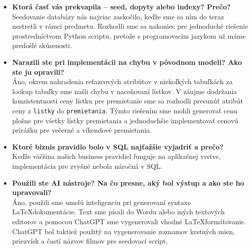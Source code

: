 \documentclass[11pt, a4paper]{article}
\begin{document}
\begin{itemize}
    \item \textbf{Ktorá časť vás prekvapila -- seed, dopyty alebo indexy?
    Prečo?} \\
    Seedovanie databázy nás najviac zaskočilo, keďže sme sa ním do teraz nestretli v rámci predmetu. Rozhodli sme sa nakoniec pre jednoduché riešenie prostredníctvom Python scriptu, pretože s programovacím jazykom už máme predošlé skúsenosti. 

    \item \textbf{Narazili ste pri implementácii na chybu v pôvodnom modeli?
    Ako ste ju opravili?} \\
    Áno, okrem nahradenia reťazcových atribútov v niekoľkých tabuľkách za lookup tabuľky sme našli chybu v naceňovaní lístkov. V záujme dodržania konzistentnosti ceny lístku pre premietanie sme sa rozhodli presunúť atribút ceny z \texttt{listky} do \texttt{premietania}. Týmto riešením sme mohli generovať cenu plošne pre všetky lístky premietania a jednoduchšie implementovať cenovú prirážku pre večerné a víkendové premietania.

    \item \textbf{Ktoré biznis pravidlo bolo v SQL najťažšie vyjadriť a prečo?} \\
    Keďže väčšina našich business pravidiel funguje na aplikačnej vrstve, implementácia pre zvyšné nebola náročná v SQL.

    \item \textbf{Použili ste AI nástroje? Na čo presne, aký bol výstup
    a ako ste ho upravovali?} \\
    Áno, použili sme umelú inteligenciu pri generovaní syntaxe \LaTeX dokumentácie. Text sme písali do Wordu alebo iných textových editorov a pomocou ChatGPT sme vygenerovali vhodné \LaTeX formátovanie. ChatGPT bol taktiež použitý na vygenerovanie zoznamov krstných mien, priezvísk a častí názvov filmov pre seedovací script.
\end{itemize}

\printbibliography
\end{document}
